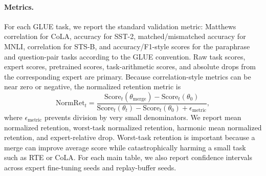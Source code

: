 \documentclass[11pt]{article}
\newcommand{\thetab}{\theta_0}
\newcommand{\loss}{\mathcal{L}}
\newcommand{\data}{\mathcal{D}}
\begin{document}
\paragraph{Metrics.}
For each GLUE task, we report the standard validation metric: Matthews correlation for CoLA, accuracy for SST-2, matched/mismatched accuracy for MNLI, correlation for STS-B, and accuracy/F1-style scores for the paraphrase and question-pair tasks according to the GLUE convention. Raw task scores, expert scores, pretrained scores, task-arithmetic scores, and absolute drops from the corresponding expert are primary. Because correlation-style metrics can be near zero or negative, the normalized retention metric is
\begin{equation}
    \mathrm{NormRet}_t
    =
    \frac{
        \mathrm{Score}_t(\theta_{\mathrm{merge}})-\mathrm{Score}_t(\thetab)
    }{
        \mathrm{Score}_t(\theta_t)-\mathrm{Score}_t(\thetab)+\epsilon_{\mathrm{metric}}
    },
    \label{eq:normalized-retention}
\end{equation}
where $\epsilon_{\mathrm{metric}}$ prevents division by very small denominators. We report mean normalized retention, worst-task normalized retention, harmonic mean normalized retention, and expert-relative drop. Worst-task retention is important because a merge can improve average score while catastrophically harming a small task such as RTE or CoLA. For each main table, we also report confidence intervals across expert fine-tuning seeds and replay-buffer seeds.

\end{document}
